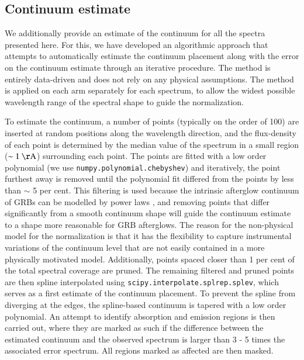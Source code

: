 \documentclass[longauth]{aa}    %
\begin{document}
\subsection{Continuum estimate} \label{continuum}

We additionally provide an estimate of the continuum for all the spectra
presented here. For this, we have developed an algorithmic approach that
attempts to automatically estimate the continuum placement along with the error
on the continuum estimate through an iterative procedure. The method is entirely
data-driven and does not rely on any physical assumptions. The method is applied
on each arm separately for each spectrum, to allow the widest possible
wavelength range of the spectral shape to guide the normalization.

To estimate the continuum, a number of points (typically on the order of 100)
are inserted at random positions along the wavelength direction, and the
flux-density of each point is determined by the median value of the spectrum in
a small region ($\sim 1~\mathrm{\AA}$) surrounding each point. The points are
fitted with a low order polynomial (we use \texttt{numpy.polynomial.chebyshev})
and iteratively, the point furthest away is removed until the polynomial fit
differed from the points by less than $\sim$ 5 per cent. This filtering is used
because the intrinsic afterglow continuum of GRBs can be modelled by power laws
\citep{Piran2005}, and removing points that differ significantly from a smooth
continuum shape will guide the continuum estimate to a shape more reasonable for
GRB afterglows. The reason for the non-physical model for the normalization is
that it has the flexibility to capture instrumental variations of the continuum
level that are not easily contained in a more physically motivated model.
Additionally, points spaced closer than 1 per cent of the total spectral
coverage are pruned. The remaining filtered and pruned points are then spline
interpolated using \texttt{scipy.interpolate.splrep.splev}, which serves as a
first estimate of the continuum placement. To prevent the spline from diverging
at the edges, the spline-based continuum is tapered with a low order polynomial.
An attempt to identify absorption and emission regions is then carried out,
where they are marked as such if the difference between the estimated continuum
and the observed spectrum is larger than 3 - 5 times the associated error
spectrum. All regions marked as affected are then masked.
\end{document}
